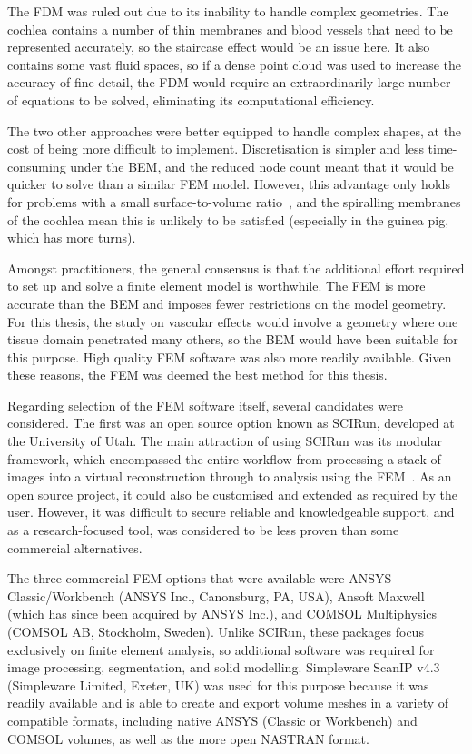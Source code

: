 The FDM was ruled out due to its inability to handle complex geometries. The
cochlea contains a number of thin membranes and blood vessels that need to be
represented accurately, so the staircase effect would be an issue here. It also
contains some vast fluid spaces, so if a dense point cloud was used to increase
the accuracy of fine detail, the FDM would require an extraordinarily large
number of equations to be solved, eliminating its computational efficiency.

The two other approaches were better equipped to handle complex shapes, at the
cost of being more difficult to implement. Discretisation is simpler and less
time-consuming under the BEM, and the reduced node count meant that it would be
quicker to solve than a similar FEM model. However, this advantage only holds
for problems with a small surface-to-volume ratio~\cite{katsikadelis2002}, and
the spiralling membranes of the cochlea mean this is unlikely to be
satisfied (especially in the guinea pig, which has more turns). 

Amongst practitioners, the general consensus is that the additional effort
required to set up and solve a finite element model is worthwhile. The FEM is
more accurate than the BEM and imposes fewer restrictions on the model geometry.
For this thesis, the study on vascular effects would involve a geometry where
one tissue domain penetrated many others, so the BEM would have been suitable
for this purpose. High quality FEM software was also more readily available.
Given these reasons, the FEM was deemed the best method for this thesis.

Regarding selection of the FEM software itself, several candidates were
considered. The first was an open source option known as SCIRun, developed at
the University of Utah. The main attraction of using SCIRun was its modular
framework, which encompassed the entire workflow from processing a stack of
images into a virtual reconstruction through to analysis using the
FEM~\cite{johnson2006, macleod2009}. As an open source project, it could also be
customised and extended as required by the user. However, it was difficult to
secure reliable and knowledgeable support, and as a research-focused tool, was
considered to be less proven than some commercial alternatives.

The three commercial FEM options that were available were ANSYS
Classic/Workbench (ANSYS Inc., Canonsburg, PA, USA), Ansoft Maxwell (which has
since been acquired by ANSYS Inc.), and COMSOL Multiphysics (COMSOL AB,
Stockholm, Sweden). Unlike SCIRun, these packages focus exclusively on finite
element analysis, so additional software was required for image processing,
segmentation, and solid modelling. Simpleware ScanIP v4.3 (Simpleware Limited,
Exeter, UK) was used for this purpose because it was readily available and is
able to create and export volume meshes in a variety of compatible formats,
including native ANSYS (Classic or Workbench) and COMSOL volumes, as well as the
more open NASTRAN format.

